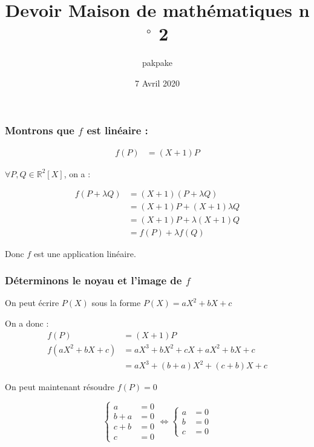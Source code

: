 \documentclass[a4paper,12pt]{article}
\title{Devoir Maison de mathématiques n$^\circ$ 2}
\author{pakpake}
\date{7 Avril 2020}
\begin{document}
\maketitle

\section{}

\subsection{}

\subsubsection{Montrons que $f$ est linéaire :}

\begin{align*}
f(P) &= (X+1)P
\end{align*}

$\forall P, Q \in \mathbb{R}^2[X]$, on a :

\begin{align*}
  f(P+\lambda Q)&=(X+1)(P+\lambda Q) \\
                &= (X+1)P + (X+1)\lambda Q \\
                &= (X+1)P + \lambda (X+1)Q \\
                &= f(P) + \lambda f(Q)
\end{align*}

Donc $f$ est une application linéaire.

\subsubsection{Déterminons le noyau et l'image de $f$}

On peut écrire $P(X)$ sous la forme $P(X)=aX^2+bX+c$

On a donc :
\begin{align*}
  f(P)         & = (X+1)P                 \\
  f(aX^2+bX+c) & = aX^3+bX^2+cX+aX^2+bX+c \\
               & = aX^3+(b+a)X^2+(c+b)X+c
\end{align*}

On peut maintenant résoudre $f(P)=0$

\[
  \left\{ \begin{array}{rl}
    a   & = 0 \\
    b+a & = 0  \\
    c+b & = 0  \\
    c   & = 0
  \end{array}\right.
  \Leftrightarrow
  \left\{ \begin{array}{rl}
    a & =0 \\
    b & =0 \\
    c & =0
  \end{array} \right.
\]
\end{document}
